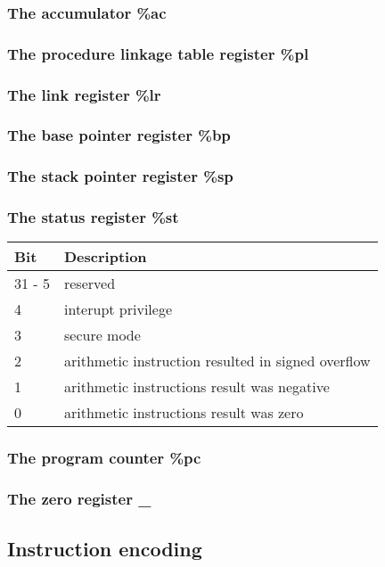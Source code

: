 \documentclass{article}
\begin{document}
\subsubsection{The accumulator \%ac}
\subsubsection{The procedure linkage table register \%pl}
\subsubsection{The link register \%lr}
\subsubsection{The base pointer register \%bp}
\subsubsection{The stack pointer register \%sp}

\subsubsection{The status register \%st}
\begin{center}
  \begin{tabular}{l|l}
    Bit    & Description \\
    \hline
    31 - 5 & reserved \\
    4      & interupt privilege \\
    3      & secure mode \\
    2      & arithmetic instruction resulted in signed overflow \\
    1      & arithmetic instructions result was negative \\
    0      & arithmetic instructions result was zero \\
  \end{tabular}
\end{center}

\subsubsection{The program counter \%pc}
\subsubsection{The zero register \_}

\subsection{Instruction encoding}
\end{document}
